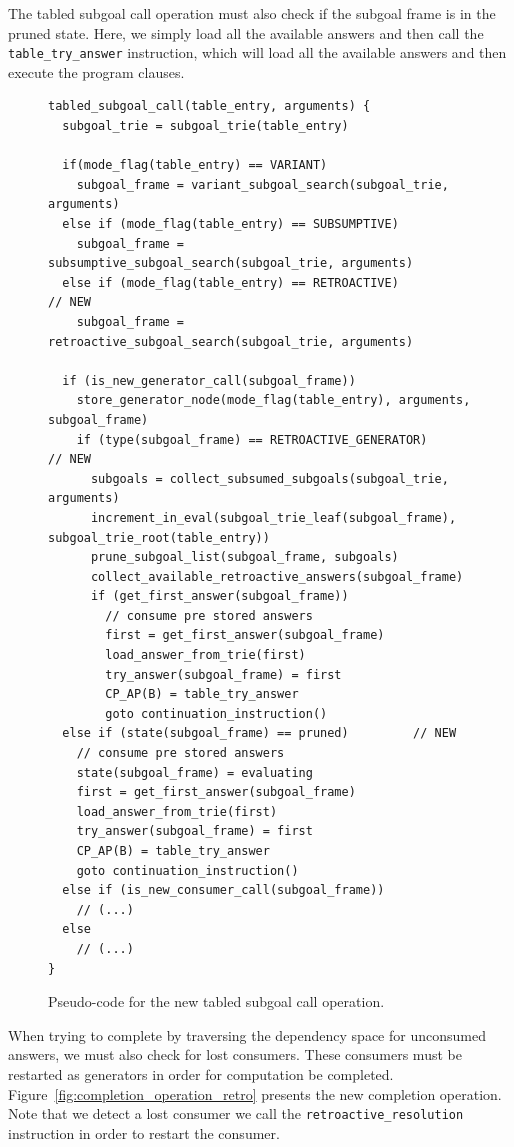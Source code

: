 The tabled subgoal call operation must also check if the subgoal frame is in the pruned state. Here,
we simply load all the available answers and then call the \texttt{table\_try\_answer} instruction,
which will load all the available answers and then execute the program clauses.

\begin{figure}[ht]
\begin{Verbatim}
tabled_subgoal_call(table_entry, arguments) {
  subgoal_trie = subgoal_trie(table_entry)
  
  if(mode_flag(table_entry) == VARIANT)
    subgoal_frame = variant_subgoal_search(subgoal_trie, arguments)
  else if (mode_flag(table_entry) == SUBSUMPTIVE)
    subgoal_frame = subsumptive_subgoal_search(subgoal_trie, arguments)
  else if (mode_flag(table_entry) == RETROACTIVE)                 // NEW
    subgoal_frame = retroactive_subgoal_search(subgoal_trie, arguments)
  
  if (is_new_generator_call(subgoal_frame))
    store_generator_node(mode_flag(table_entry), arguments, subgoal_frame)
    if (type(subgoal_frame) == RETROACTIVE_GENERATOR)             // NEW
      subgoals = collect_subsumed_subgoals(subgoal_trie, arguments)
      increment_in_eval(subgoal_trie_leaf(subgoal_frame), subgoal_trie_root(table_entry))
      prune_subgoal_list(subgoal_frame, subgoals)
      collect_available_retroactive_answers(subgoal_frame)
      if (get_first_answer(subgoal_frame))
        // consume pre stored answers
        first = get_first_answer(subgoal_frame)
        load_answer_from_trie(first)
        try_answer(subgoal_frame) = first
        CP_AP(B) = table_try_answer
        goto continuation_instruction()
  else if (state(subgoal_frame) == pruned)         // NEW
    // consume pre stored answers
    state(subgoal_frame) = evaluating
    first = get_first_answer(subgoal_frame)
    load_answer_from_trie(first)
    try_answer(subgoal_frame) = first
    CP_AP(B) = table_try_answer
    goto continuation_instruction()
  else if (is_new_consumer_call(subgoal_frame))
    // (...)
  else
    // (...)
}
\end{Verbatim}
\caption{Pseudo-code for the new tabled subgoal call operation.}
\label{fig:tabled_subgoal_call_retro}
\end{figure}

When trying to complete by traversing the dependency space for unconsumed answers, we must
also check for lost consumers. These consumers must be restarted as generators in order for
computation be completed. Figure~\ref{fig:completion_operation_retro} presents the new completion
operation. Note that we detect a lost consumer we call the \texttt{retroactive\_resolution}
instruction in order to restart the consumer.

